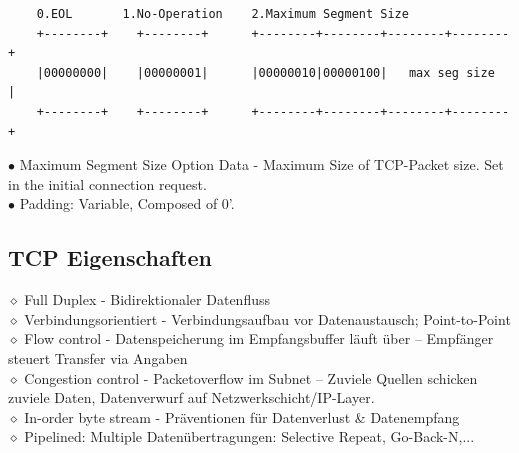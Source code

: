 \documentclass[11pt]{article}
\begin{document}
    \begin{verbatim}
    0.EOL       1.No-Operation    2.Maximum Segment Size
    +--------+    +--------+      +--------+--------+--------+--------+
    |00000000|    |00000001|      |00000010|00000100|   max seg size  |
    +--------+    +--------+      +--------+--------+--------+--------+
    \end{verbatim}
    \begin{addmargin}[1em]{1em}
        $\bullet$ Maximum Segment Size Option Data - Maximum Size of TCP-Packet size. Set in the initial connection request.\\
        $\bullet$ Padding: Variable, Composed of 0'.
    \end{addmargin}

    \subsection{TCP Eigenschaften}
        $\diamond$ Full Duplex - Bidirektionaler Datenfluss\\
        $\diamond$ Verbindungsorientiert - Verbindungsaufbau vor Datenaustausch; Point-to-Point\\
        $\diamond$ Flow control - Datenspeicherung im Empfangsbuffer läuft über -- Empfänger steuert Transfer via Angaben\\
        $\diamond$ Congestion control - Packetoverflow im Subnet -- Zuviele Quellen schicken zuviele Daten, Datenverwurf auf Netzwerkschicht/IP-Layer.\\
        $\diamond$ In-order byte stream - Präventionen für Datenverlust \& Datenempfang\\
        $\diamond$ Pipelined: Multiple Datenübertragungen: Selective Repeat, Go-Back-N,...\\
\end{document}
